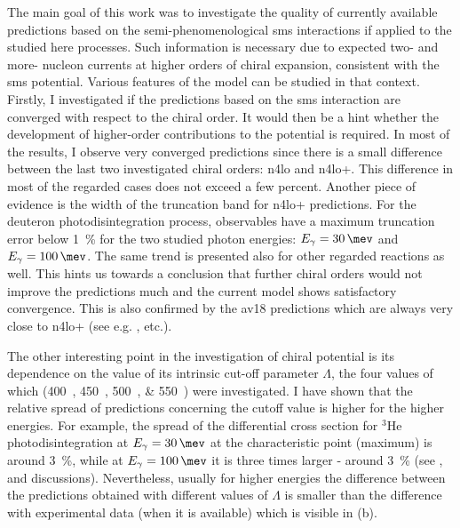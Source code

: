 The main goal of this work was to investigate the quality of currently available
predictions based on the semi-phenomenological \gls{sms}
interactions if applied to the studied here processes.
Such information is necessary due to expected two- and more- nucleon currents
at higher orders of chiral expansion, consistent with the \gls{sms} potential.
Various features of the model can be studied in that context.
Firstly, I investigated if the predictions based on the \gls{sms} interaction
are converged with respect to the chiral order.
It would then be a hint whether the development of higher-order contributions to the potential is required.
In most of the results, I observe very converged predictions since there is a small difference
between the last two investigated chiral orders: \gls{n4lo} and \gls{n4lo+}. This
difference in most of the regarded cases does not exceed a few percent.
Another piece of evidence is the width of the truncation band for \gls{n4lo+} predictions.
For the deuteron photodisintegration process, observables have a maximum
truncation error below \SI{1}{\percent} for the two studied photon energies:
$E_\gamma=\SI{30}{\mev}$ and $E_\gamma=\SI{100}{\mev}$.
The same trend is presented also for other regarded reactions as well.
This hints us towards a conclusion that further chiral orders would not
improve the predictions much and the current model shows satisfactory convergence.
This is also confirmed by the \gls{av18} predictions which are
always very close to \gls{n4lo+} (see e.g. ,  etc.).

The other interesting point in the investigation of chiral potential is its dependence
on the value of its intrinsic cut-off parameter $\Lambda$, the four values of which (\SIlist[list-units = single]{400;450;500;550}{\mev}) 
were investigated. I have shown that the relative spread of predictions 
concerning the cutoff value is higher for the higher energies.
For example, the spread of the differential cross section for $^3$He photodisintegration
at $E_\gamma=\SI{30}{\mev}$ at the characteristic point (maximum) is around \SI{3}{\percent},
while at $E_\gamma=\SI{100}{\mev}$ it is three times larger - around \SI{3}{\percent}
(see ,  and discussions).
Nevertheless, usually for higher energies the difference between the predictions
obtained with different values of $\Lambda$ is smaller than the difference with experimental
data (when it is available) which is visible in (b).

